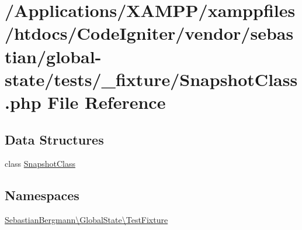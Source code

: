 \hypertarget{_snapshot_class_8php}{}\section{/\+Applications/\+X\+A\+M\+P\+P/xamppfiles/htdocs/\+Code\+Igniter/vendor/sebastian/global-\/state/tests/\+\_\+fixture/\+Snapshot\+Class.php File Reference}
\label{_snapshot_class_8php}
\subsection*{Data Structures}
\begin{DoxyCompactItemize}
\item 
class \mbox{\hyperlink{class_sebastian_bergmann_1_1_global_state_1_1_test_fixture_1_1_snapshot_class}{Snapshot\+Class}}
\end{DoxyCompactItemize}
\subsection*{Namespaces}
\begin{DoxyCompactItemize}
\item 
 \mbox{\hyperlink{namespace_sebastian_bergmann_1_1_global_state_1_1_test_fixture}{Sebastian\+Bergmann\textbackslash{}\+Global\+State\textbackslash{}\+Test\+Fixture}}
\end{DoxyCompactItemize}
